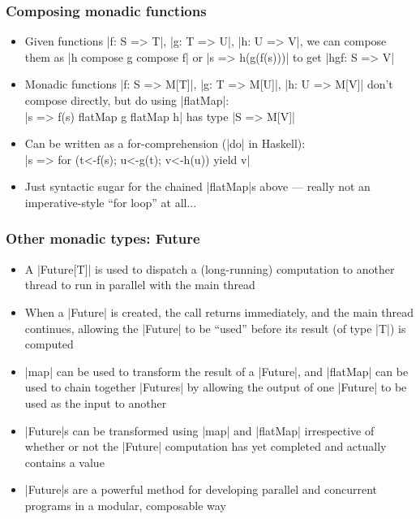 \documentclass[mathserif,handout]{beamer}
\begin{document}
\begin{frame}[fragile]
  \frametitle{Composing monadic functions}
  \begin{itemize}
  \item Given functions |f: S => T|, |g: T => U|, |h: U => V|, we can compose them as |h compose g compose f| or |s => h(g(f(s)))| to get |hgf: S => V|
  \item Monadic functions |f: S => M[T]|, |g: T => M[U]|, |h: U => M[V]| don't compose directly, but do using |flatMap|:\\
    |s => f(s) flatMap g flatMap h| has type |S => M[V]|
  \item Can be written as a \alert{for-comprehension} (|do| in Haskell):\\
    |s => for (t<-f(s); u<-g(t); v<-h(u)) yield v|
    \item Just syntactic sugar for the chained |flatMap|s above --- really \alert{not} an imperative-style ``for loop'' at all...
  \end{itemize}
\end{frame}

\begin{frame}[fragile]
  \frametitle{Other monadic types: Future}
  \begin{itemize}
  \item A |Future[T]| is used to dispatch a (long-running) computation to another thread to run in parallel with the main thread
  \item When a |Future| is created, the call returns immediately, and the main thread continues, allowing the |Future| to be ``used'' before its result (of type |T|) is computed
  \item |map| can be used to transform the result of a |Future|, and |flatMap| can be used to chain together |Futures| by allowing the output of one |Future| to be used as the input to another
  \item |Future|s can be transformed using |map| and |flatMap| irrespective of whether or not the |Future| computation has yet completed and actually contains a value
    \item |Future|s are a powerful method for developing parallel and concurrent programs in a modular, composable way
  \end{itemize}
\end{frame}
\end{document}
